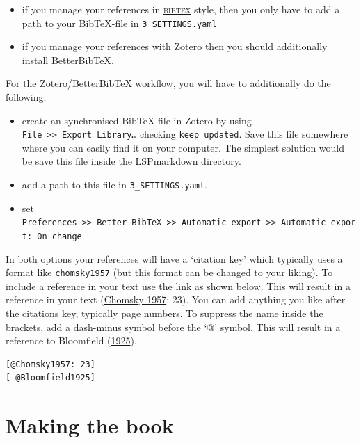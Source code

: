 \begin{itemize}
\tightlist
\item
  if you manage your references in
  \href{http://www.bibtex.org}{\textsc{bibtex}} style, then you only
  have to add a path to your BibTeX-file in \texttt{3\_SETTINGS.yaml}
\item
  if you manage your references with
  \href{https://www.zotero.org}{Zotero} then you should additionally
  install
  \href{https://retorque.re/zotero-better-bibtex/installation/}{BetterBibTeX}.
\end{itemize}

For\paragraphnumber{[2.13]} the Zotero/BetterBibTeX workflow, you will
have to additionally do the following:

\begin{itemize}
\tightlist
\item
  create an synchronised BibTeX file in Zotero by using
  \texttt{File\ \textgreater{}\textgreater{}\ Export\ Library…} checking
  \texttt{keep\ updated}. Save this file somewhere where you can easily
  find it on your computer. The simplest solution would be save this
  file inside the LSPmarkdown directory.
\item
  add a path to this file in \texttt{3\_SETTINGS.yaml}.
\item
  set
  \texttt{Preferences\ \textgreater{}\textgreater{}\ Better\ BibTeX\ \textgreater{}\textgreater{}\ Automatic\ export\ \textgreater{}\textgreater{}\ Automatic\ export:\ On\ change}.
\end{itemize}

In\paragraphnumber{[2.14]} both options your references will have a
`citation key' which typically uses a format like \texttt{chomsky1957}
(but this format can be changed to your liking). To include a reference
in your text use the link as shown below. This will result in a
reference in your text (\protect\hyperlink{ref-Chomsky1957}{Chomsky
1957}: 23). You can add anything you like after the citations key,
typically page numbers. To suppress the name inside the brackets, add a
dash-minus symbol before the `@' symbol. This will result in a reference
to Bloomfield (\protect\hyperlink{ref-Bloomfield1925}{1925}).

\begin{verbatim}
[@Chomsky1957: 23]
[-@Bloomfield1925]
\end{verbatim}

\hypertarget{making-the-book}{%
\chapter{Making the book}\label{making-the-book}}

